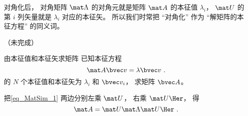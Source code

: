 对角化后， 对角矩阵 $\mat \Lambda$ 的对角元就是矩阵 $\mat A$ 的本征值 $\lambda_i$， $\mat U$ 的第 $i$ 列矢量就是 $\lambda_i$ 对应的本征矢。 所以我们时常把 “对角化” 作为 “解矩阵的本征方程” 的同义词。

（未完成）

\begin{example}{由本征值和本征矢求矩阵}
已知本征方程
\begin{equation}
\mat A \bvec v = \lambda \bvec v~.
\end{equation}
的 $N$ 个本征值和本征矢为 $\lambda_i$ 和 $\bvec v_i$， 求矩阵 $\bvec A$。

把\autoref{eq_MatSim_1} 两边分别左乘 $\mat U$， 右乘 $\mat U\Her$， 得
\begin{equation}
\mat A = \mat U \mat \Lambda \mat U\Her~.
\end{equation}
\end{example}
